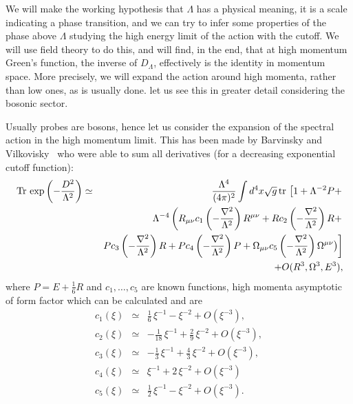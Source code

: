 \documentclass[12pt,a4paper]{article}
\newcommand{\bea}{\begin{eqnarray}}
\newcommand{\eea}{\end{eqnarray}}
\newcommand{\formu}[1]{$  #1$}
\newcommand{\Tr}[1]{\:{\rm Tr}\,#1}
\begin{document}
We will make the working hypothesis that \formu{\Lambda} has a physical meaning, it is a scale indicating a phase transition, and we can try to infer some properties of the phase above \formu{\Lambda} studying the high energy limit of the action with the cutoff. We will use field theory to do this, and will find, in the end, that at high momentum Green's function, the inverse of \formu{D_\Lambda}, effectively is the identity in momentum space. More precisely, we will expand the action around high momenta, rather than low ones, as is usually done. let us see this in greater detail considering the bosonic sector.



Usually probes are bosons, hence let us consider the expansion of the spectral action in the high momentum limit.
This has been made by Barvinsky and Vilkovisky~\cite{Barvinsky:1990up} who were able to sum all derivatives (for a decreasing exponential cutoff function):
\bea
\Tr{\exp{\left(-\frac{D^2}{\Lambda^2 }\right)}} 
&\simeq&\frac{\Lambda^4}{(4\pi )^2} \int d^4x \sqrt{g}\, {\rm tr}\, \left[ 1 + \Lambda^{-2}P + \right. \nonumber\\
&&\Lambda^{-4}\left( 
R_{\mu\nu} c_1\left(-\frac{\nabla^2}{\Lambda^2}\right) R^{\mu\nu} + Rc_2\left(-\frac{\nabla^2}{\Lambda^2}\right)R  +\right.\nonumber\\
&&\left. Pc_3\left(-\frac{\nabla^2}{\Lambda^2}\right)R +Pc_4\left(-\frac{\nabla^2}{\Lambda^2}\right) P 
+ \Omega_{\mu\nu} c_5\left(-\frac{\nabla^2}{\Lambda^2}\right)\Omega^{\mu\nu}
\bigr) \right]  \nonumber\\
&&+ O(R^3,\Omega^3,E^3) ,
\eea
where \formu{P= E+\tfrac 16 R} and  \formu{c_1,\ldots,c_5} are known functions, high momenta asymptotic of form factor which can be calculated and are
\bea
c_1(\xi) &\simeq& \frac{1}{6}\,{\xi}^{-1}-{\xi}^{-2} + O \left( {\xi}^
{-3} \right), \nonumber \\
c_2(\xi) &\simeq& -\frac{1}{18}\,{\xi}^{-1}+\frac{2}{9}\,{\xi}^{-2} + O \left( {\xi}^{-3}
 \right),  \nonumber \\
 c_3(\xi) &\simeq& -\frac{1}{3}\,{\xi}^{-1}+\frac{4}{3}\,{\xi}^{-2} + O
 \left( {\xi}^{-3} \right), \nonumber\\
 c_4(\xi) &\simeq& {\xi}^{-1}+2\,{\xi}^{-2} + O \left( {\xi}^{-3}
 \right)  \nonumber\\
 c_5(\xi) &\simeq& \frac{1}{2}\,{\xi}^{-1}-{\xi}^{-2} + O \left( {\xi}
^{-3} \right).
\eea
\end{document}
